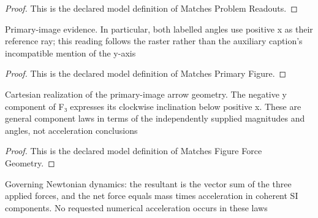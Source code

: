 \begin{proof}
  This is the declared model definition of Matches Problem Readouts.
\end{proof}
\begin{definition}
  \label{def:physics:phyx-mini-0755:phyxminiproblems-problemphyxmini0755-matchesprimaryfigure}
  Primary-image evidence. In particular, both labelled angles use positive x as their reference ray; this reading follows the raster rather than the auxiliary caption's incompatible mention of the y-axis
\end{definition}
\begin{proof}
  This is the declared model definition of Matches Primary Figure.
\end{proof}
\begin{definition}
  \label{def:physics:phyx-mini-0755:phyxminiproblems-problemphyxmini0755-matchesfigureforcegeometry}
  Cartesian realization of the primary-image arrow geometry. The negative y component of F₃ expresses its clockwise inclination below positive x. These are general component laws in terms of the independently supplied magnitudes and angles, not acceleration conclusions
\end{definition}
\begin{proof}
  This is the declared model definition of Matches Figure Force Geometry.
\end{proof}
\begin{definition}
  \label{def:physics:phyx-mini-0755:phyxminiproblems-problemphyxmini0755-satisfiesnewtoniandynamics}
  Governing Newtonian dynamics: the resultant is the vector sum of the three applied forces, and the net force equals mass times acceleration in coherent SI components. No requested numerical acceleration occurs in these laws
\end{definition}
